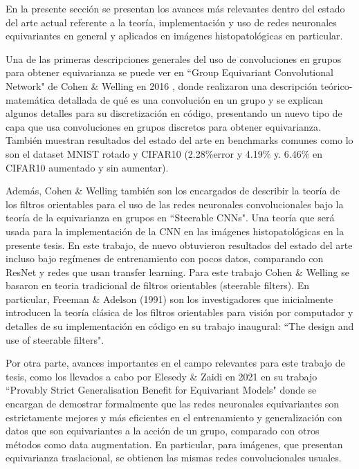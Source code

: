 \documentclass[12pt,letterpaper,final, openany]{scrbook}
\begin{document}
En la presente sección se presentan los avances más relevantes dentro del estado del arte actual referente a la teoría, implementación y uso de redes neuronales equivariantes en general y aplicados en imágenes histopatológicas en particular.

Una de las primeras descripciones generales del uso de convoluciones en grupos para obtener equivarianza se puede ver en ``Group Equivariant Convolutional Network" de Cohen \& Welling en 2016 \cite{cohen_group_2016},  donde realizaron una descripción teórico-matemática detallada de qué es una convolución en un grupo y se explican algunos detalles para su discretización en código, presentando un nuevo tipo de capa que usa convoluciones en grupos discretos para obtener equivarianza. También muestran resultados del estado del arte en benchmarks comunes como lo son el dataset MNIST rotado y CIFAR10 (2.28\%error y 4.19\% y. 6.46\% en CIFAR10 aumentado y sin aumentar).

Además, Cohen \& Welling  también son los encargados de describir la teoría de los filtros orientables para el uso de las redes neuronales convolucionales bajo la teoría de la equivarianza en grupos en ``Steerable CNNs"\cite{cohen_steerable_2016}. Una teoría que será usada para la implementación de la CNN en las imágenes histopatológicas en la presente tesis. En este trabajo, de nuevo obtuvieron resultados del estado del arte incluso bajo regímenes de entrenamiento con pocos datos, comparando con ResNet y redes que usan transfer learning. Para este trabajo Cohen \& Welling se basaron en teoria tradicional de filtros orientables (steerable filters). En particular, Freeman \& Adelson (1991) son los investigadores que inicialmente introducen la teoría clásica de los filtros orientables para visión por computador y detalles de su implementación en código en su trabajo inaugural: ``The design and use of steerable filters"\cite{freeman_design_1991}.

Por otra parte, avances importantes en el campo relevantes para este trabajo de tesis, como los llevados a cabo por Elesedy \& Zaidi en 2021 en su trabajo ``Provably Strict Generalisation Benefit for Equivariant Models" \cite{elesedy_provably_2021} donde se encargan de demostrar formalmente que las redes neuronales equivariantes son estrictamente mejores y más eficientes en el entrenamiento y generalización con datos que son equivariantes a la acción de un grupo, comparado con otros métodos como data augmentation. En particular, para imágenes, que presentan equivarianza traslacional, se obtienen las mismas redes convolucionales usuales.
\end{document}
